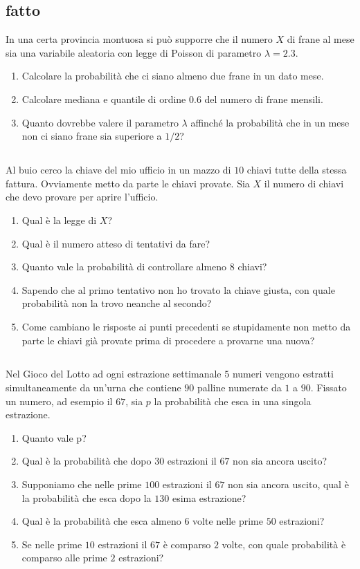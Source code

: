 \subsection{fatto}

In una certa provincia montuosa si può supporre che il numero $X$ di frane al mese sia una variabile aleatoria con legge di Poisson di parametro $\lambda =2.3$.
\begin{enumerate}
\item Calcolare la probabilità che ci siano almeno due frane in un dato mese.
\item Calcolare mediana e quantile di ordine $0.6$ del numero di frane mensili.
\item Quanto dovrebbe valere il parametro $\lambda $ affinché la probabilità che in un mese non ci siano frane sia superiore a $1/2$?
\end{enumerate}
\subsection{}

Al buio cerco la chiave del mio ufficio in un mazzo di $10$ chiavi tutte della stessa fattura. Ovviamente metto da parte le chiavi provate. Sia $X$ il numero di chiavi che devo provare per aprire l'ufficio.
\begin{enumerate}
\item Qual è la legge di $X$?
\item Qual è il numero atteso di tentativi da fare?
\item Quanto vale la probabilità di controllare almeno $8$ chiavi?
\item Sapendo che al primo tentativo non ho trovato la chiave giusta, con quale probabilità non la trovo neanche al secondo?
\item Come cambiano le risposte ai punti precedenti se stupidamente non metto da parte le chiavi già provate prima di procedere a provarne una nuova?
\end{enumerate}
\subsection{}

Nel Gioco del Lotto ad ogni estrazione settimanale $5$ numeri vengono estratti simultaneamente da un'urna che contiene $90$ palline numerate da $1$ a $90$. Fissato un numero, ad esempio il $67$, sia $p$ la probabilità che esca in una singola estrazione.
\begin{enumerate}
\item Quanto vale p?
\item Qual è la probabilità che dopo $30$ estrazioni il $67$ non sia ancora uscito?
\item Supponiamo che nelle prime $100$ estrazioni il $67$ non sia ancora uscito, qual è la probabilità che esca dopo la $130$ esima estrazione?
\item Qual è la probabilità che esca almeno $6$ volte nelle prime $50$ estrazioni?
\item Se nelle prime $10$ estrazioni il $67$ è comparso $2$ volte, con quale probabilità è comparso alle prime $2$ estrazioni?
\end{enumerate}
